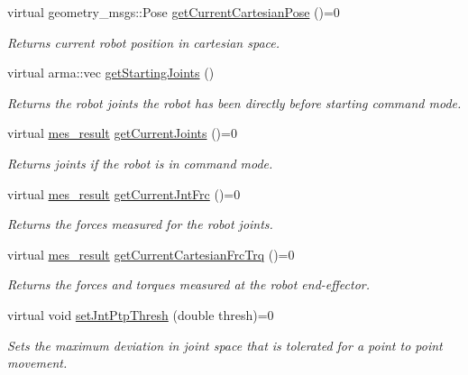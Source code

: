 \begin{DoxyCompactItemize}
virtual geometry\-\_\-msgs\-::\-Pose \hyperlink{classkukadu_1_1ControlQueue_a9e79e1d0d9697bbf146d66a2d01fea9e}{get\-Current\-Cartesian\-Pose} ()=0
\begin{DoxyCompactList}\small\item\em Returns current robot position in cartesian space. \end{DoxyCompactList}\item 
virtual arma\-::vec \hyperlink{classkukadu_1_1ControlQueue_a53b2ecff4ae71b1e01d18793f63645ce}{get\-Starting\-Joints} ()
\begin{DoxyCompactList}\small\item\em Returns the robot joints the robot has been directly before starting command mode. \end{DoxyCompactList}\item 
virtual \hyperlink{structmes__result}{mes\-\_\-result} \hyperlink{classkukadu_1_1ControlQueue_a6ba7b6db5099073eadd7bc04792bc643}{get\-Current\-Joints} ()=0
\begin{DoxyCompactList}\small\item\em Returns joints if the robot is in command mode. \end{DoxyCompactList}\item 
virtual \hyperlink{structmes__result}{mes\-\_\-result} \hyperlink{classkukadu_1_1ControlQueue_a1468c1771ea7dfd1ee3b0a7279407241}{get\-Current\-Jnt\-Frc} ()=0
\begin{DoxyCompactList}\small\item\em Returns the forces measured for the robot joints. \end{DoxyCompactList}\item 
virtual \hyperlink{structmes__result}{mes\-\_\-result} \hyperlink{classkukadu_1_1ControlQueue_aa557f386f03cfb4986ed7cd9997212ab}{get\-Current\-Cartesian\-Frc\-Trq} ()=0
\begin{DoxyCompactList}\small\item\em Returns the forces and torques measured at the robot end-\/effector. \end{DoxyCompactList}\item 
virtual void \hyperlink{classkukadu_1_1ControlQueue_a5af587fff906cf978225a317e701d41f}{set\-Jnt\-Ptp\-Thresh} (double thresh)=0
\begin{DoxyCompactList}\small\item\em Sets the maximum deviation in joint space that is tolerated for a point to point movement. \end{DoxyCompactList}\item 

\end{DoxyCompactItemize}
